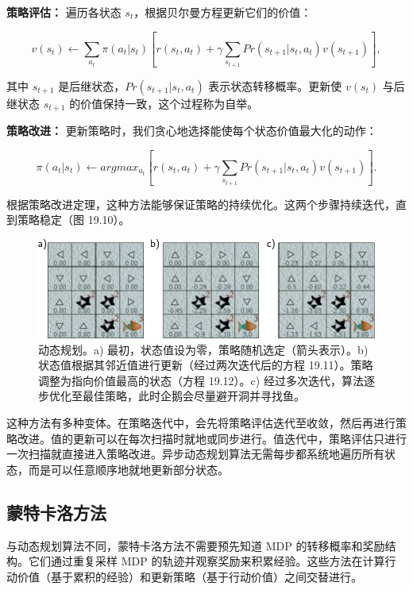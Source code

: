 \documentclass[lang=cn,newtx,10pt,scheme=chinese]{elegantbook}
\begin{document}
\textbf{策略评估：} 遍历各状态 \(s_t\)，根据贝尔曼方程更新它们的价值：

\begin{equation}
v(s_t) \leftarrow \sum_{a_t} \pi(a_t|s_t) \left[ r(s_t, a_t) + \gamma \sum_{s_{t+1}} Pr(s_{t+1}|s_t, a_t)v(s_{t+1}) \right], 
\end{equation}

其中 \(s_{t+1}\) 是后继状态，\(Pr(s_{t+1}|s_t, a_t)\) 表示状态转移概率。更新使 \(v(s_t)\) 与后继状态 \(s_{t+1}\) 的价值保持一致，这个过程称为自举。

\textbf{策略改进：} 更新策略时，我们贪心地选择能使每个状态价值最大化的动作：

\begin{equation}
\pi(a_t|s_t) \leftarrow argmax_{a_t} \left[ r(s_t, a_t) + \gamma \sum_{s_{t+1}} Pr(s_{t+1}|s_t, a_t)v(s_{t+1}) \right]. 
\end{equation}

根据策略改进定理，这种方法能够保证策略的持续优化。这两个步骤持续迭代，直到策略稳定（图 19.10）。

\begin{figure}[ht!]
\centering
\includegraphics[width=0.7\linewidth]{PDFFigures/UDLChap19PDF/ReinforceDP.pdf}
\caption{动态规划。a) 最初，状态值设为零，策略随机选定（箭头表示）。b) 状态值根据其邻近值进行更新（经过两次迭代后的方程 19.11）。策略调整为指向价值最高的状态（方程 19.12）。c) 经过多次迭代，算法逐步优化至最佳策略，此时企鹅会尽量避开洞并寻找鱼。}
\end{figure}

这种方法有多种变体。在策略迭代中，会先将策略评估迭代至收敛，然后再进行策略改进。值的更新可以在每次扫描时就地或同步进行。值迭代中，策略评估只进行一次扫描就直接进入策略改进。异步动态规划算法无需每步都系统地遍历所有状态，而是可以任意顺序地就地更新部分状态。

\subsection{蒙特卡洛方法}
与动态规划算法不同，蒙特卡洛方法不需要预先知道 MDP 的转移概率和奖励结构。它们通过重复采样 MDP 的轨迹并观察奖励来积累经验。这些方法在计算行动价值（基于累积的经验）和更新策略（基于行动价值）之间交替进行。
\end{document}

